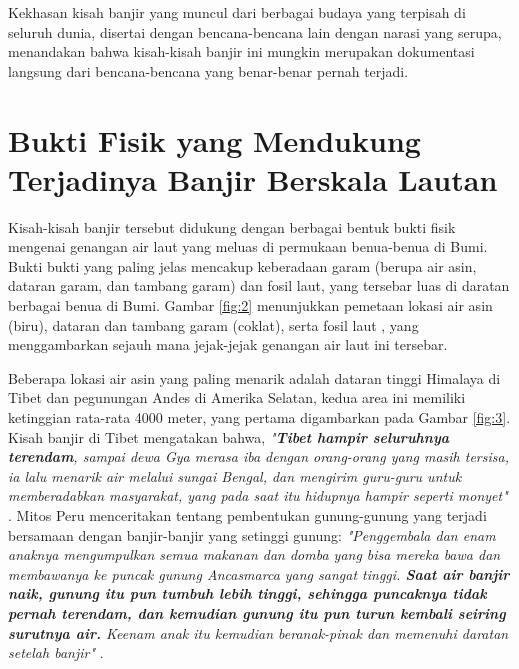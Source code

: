 \documentclass[10pt,twocolumn,letterpaper]{article}
\begin{document}
Kekhasan kisah banjir yang muncul dari berbagai budaya yang terpisah di seluruh dunia, disertai dengan bencana-bencana lain dengan narasi yang serupa, menandakan bahwa kisah-kisah banjir ini mungkin merupakan dokumentasi langsung dari bencana-bencana yang benar-benar pernah terjadi.

\section{Bukti Fisik yang Mendukung Terjadinya Banjir Berskala Lautan}

Kisah-kisah banjir tersebut didukung dengan berbagai bentuk bukti fisik mengenai genangan air laut yang meluas di permukaan benua-benua di Bumi. Bukti bukti yang paling jelas mencakup keberadaan garam (berupa air asin, dataran garam, dan tambang garam) dan fosil laut, yang tersebar luas di daratan berbagai benua di Bumi. Gambar \ref{fig:2} menunjukkan pemetaan lokasi air asin (biru), dataran dan tambang garam (coklat), serta fosil laut \cite{15,16,86,87}, yang menggambarkan sejauh mana jejak-jejak genangan air laut ini tersebar.

Beberapa lokasi air asin yang paling menarik adalah dataran tinggi Himalaya di Tibet dan pegunungan Andes di Amerika Selatan, kedua area ini memiliki ketinggian rata-rata 4000 meter, yang pertama digambarkan pada Gambar \ref{fig:3}. Kisah banjir di Tibet mengatakan bahwa, \textit{"\textbf{Tibet hampir seluruhnya terendam}, sampai dewa Gya merasa iba dengan orang-orang yang masih tersisa, ia lalu menarik air melalui sungai Bengal, dan mengirim guru-guru untuk memberadabkan masyarakat, yang pada saat itu hidupnya hampir seperti monyet"} \cite{3}. Mitos Peru menceritakan tentang pembentukan gunung-gunung yang terjadi bersamaan dengan banjir-banjir yang setinggi gunung: \textit{"Penggembala dan enam anaknya mengumpulkan semua makanan dan domba yang bisa mereka bawa dan membawanya ke puncak gunung Ancasmarca yang sangat tinggi. \textbf{Saat air banjir naik, gunung itu pun tumbuh lebih tinggi, sehingga puncaknya tidak pernah terendam, dan kemudian gunung itu pun turun kembali seiring surutnya air.} Keenam anak itu kemudian beranak-pinak dan memenuhi daratan setelah banjir"} \cite{3}.
\end{document}
